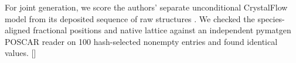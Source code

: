 For joint generation, we score the authors' separate unconditional CrystalFlow model from its deposited sequence of raw structures \cite{crystalflow}. We checked the species-aligned fractional positions and native lattice against an independent pymatgen POSCAR reader on 100 hash-selected nonempty entries and found identical values. []
